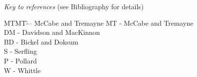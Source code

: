 \vspace{5mm}
\noindent
{\it Key to references} (see Bibliography for details)
\begin{tabbing}
MTMT\= --- \= McCabe and Tremayne\kill
MT \> - \> McCabe and Tremayne \\
DM\>  -\>  Davidson and MacKinnon\\
BD\>  -\>  Bickel and Doksum\\
S\>   -\>  Serfling\\
P\>   -\>  Pollard\\
W \>  -\>  Whittle
\end{tabbing}

